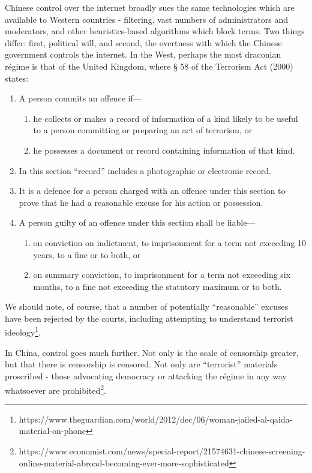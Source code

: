 Chinese control over the internet broadly sues the same technologies
which are available to Western countries - filtering, vast numbers of
administrators and moderators, and other heuristics-based algorithms
which block terms. Two things differ: first, political will, and second,
the overtness with which the Chinese government controls the internet.
In the West, perhaps the most draconian régime is that of the United
Kingdom, where § 58 of the Terrorism Act (2000) states:

\begin{enumerate}
\item
  A person commits an offence if---

  \begin{enumerate}
  \item
    he collects or makes a record of information of a kind likely to be
    useful to a person committing or preparing an act of terrorism, or
  \item
    he possesses a document or record containing information of that
    kind.
  \end{enumerate}
\item
  In this section ``record'' includes a photographic or electronic
  record.
\item
  It is a defence for a person charged with an offence under this
  section to prove that he had a reasonable excuse for his action or
  possession.
\item
  A person guilty of an offence under this section shall be liable---

  \begin{enumerate}
  \item
    on conviction on indictment, to imprisonment for a term not
    exceeding 10 years, to a fine or to both, or
  \item
    on summary conviction, to imprisonment for a term not exceeding six
    months, to a fine not exceeding the statutory maximum or to both.
  \end{enumerate}
\end{enumerate}

We should note, of course, that a number of potentially ``reasonable''
excuses have been rejected by the courts, including attempting to
understand terrorist ideology\footnote{https://www.theguardian.com/world/2012/dec/06/woman-jailed-al-qaida-material-on-phone}.

In China, control goes much further. Not only is the scale of censorship
greater, but that there is censorship is censored. Not only are
``terrorist'' materials proscribed - those advocating democracy or
attacking the régime in any way whatsoever are prohibited\footnote{https://www.economist.com/news/special-report/21574631-chinese-screening-online-material-abroad-becoming-ever-more-sophisticated}.

